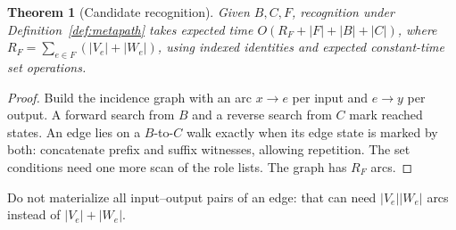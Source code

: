 \documentclass[11pt]{article}
\theoremstyle{plain}
\newtheorem{theorem}{Theorem}
\theoremstyle{definition}
\theoremstyle{remark}
\begin{document}
\begin{theorem}[Candidate recognition]\label{prop:recog}
Given $B,C,F$, recognition under Definition~\ref{def:metapath} takes expected time
$O(R_F+|F|+|B|+|C|)$, where $R_F=\sum_{e\in F}(|V_e|+|W_e|)$, using indexed identities and
expected constant-time set operations.
\end{theorem}
\begin{proof}
Build the incidence graph with an arc $x\to e$ per input and $e\to y$ per output. A
forward search from $B$ and a reverse search from $C$ mark reached states. An edge lies
on a $B$-to-$C$ walk exactly when its edge state is marked by both: concatenate prefix
and suffix witnesses, allowing repetition. The set conditions need one more scan of the
role lists. The graph has $R_F$ arcs.
\end{proof}
Do not materialize all input--output pairs of an edge: that can need $|V_e||W_e|$ arcs
instead of $|V_e|+|W_e|$.
\end{document}
